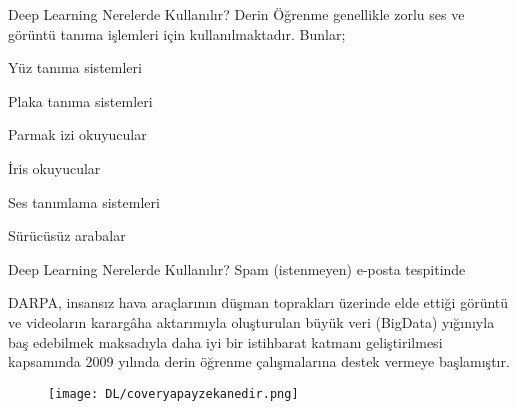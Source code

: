 \documentclass{beamer}                                                                                          %
\begin{document}
	
	\begin{frame}{Deep Learning Nerelerde Kullanılır?}
	    Derin Öğrenme genellikle zorlu ses ve görüntü tanıma işlemleri için kullanılmaktadır. Bunlar; \par \vspace{10}
		    \color{myred1} \color{black}Yüz tanıma sistemleri\par \vspace{7}
			\color{myred1} \color{black}Plaka tanıma sistemleri\par \vspace{7}
			\color{myred1} \color{black}Parmak izi okuyucular\par \vspace{7} 
			\color{myred1} \color{black}İris okuyucular\par \vspace{7} 
			\color{myred1} \color{black}Ses tanımlama sistemleri\par \vspace{7} 
			\color{myred1} \color{black}Sürücüsüz arabalar  
    \end{frame}
    
	
	\begin{frame}{Deep Learning Nerelerde Kullanılır?}
        \justifying
            \color{myred1} \color{black}Spam (istenmeyen) e-posta tespitinde \par \vspace{7}
    		\color{myred1} \color{black}DARPA, insansız hava araçlarının düşman toprakları üzerinde elde ettiği görüntü ve videoların karargâha aktarımıyla oluşturulan büyük veri (BigData) yığınıyla baş edebilmek maksadıyla daha iyi bir istihbarat katmanı geliştirilmesi kapsamında 2009 yılında derin öğrenme çalışmalarına destek vermeye başlamıştır. 
    \end{frame}
    
    
    \begin{frame}
        \begin{center}
            \begin{figure}
                \vspace*{-7mm}
                \hspace*{-18.5 pt}
                \centering
                \texttt{[image: DL/coveryapayzekanedir.png]}
            \end{figure}
        \end{center}
    \end{frame}
    
\end{document}

